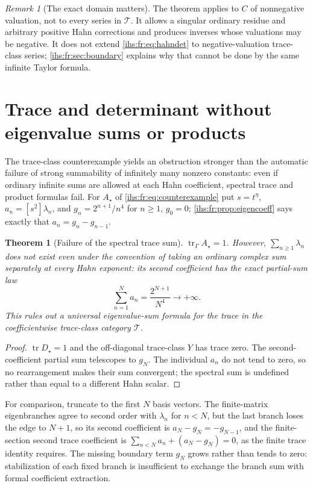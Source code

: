 \documentclass[11pt,a4paper]{article}
\numberwithin{equation}{section}
\newtheorem{theorem}{Theorem}[section]
\theoremstyle{definition}
\theoremstyle{remark}
\newtheorem{remark}[remark]{Remark}
\newcommand{\Tr}{\operatorname{tr}}
\newcommand{\TT}{\mathscr T}
\begin{document}
\begin{remark}[The exact domain matters]\label{ihs:fr:rem:domain}
The theorem applies to $C$ of nonnegative valuation, not to every series in
$\TT$. It allows a singular ordinary residue and arbitrary positive Hahn
corrections and produces inverses whose valuations may be negative. It does
not extend \eqref{ihs:fr:eq:hahndet} to negative-valuation trace-class
series; \cref{ihs:fr:sec:boundary} explains why that cannot be done by the
same infinite Taylor formula.
\end{remark}

\section{Trace and determinant without eigenvalue sums or products}\label{ihs:fr:sec:lidskii}

The trace-class counterexample yields an obstruction stronger than the
automatic failure of strong summability of infinitely many nonzero
constants: even if ordinary infinite sums are allowed at each Hahn
coefficient, spectral trace and product formulas fail. For $A_\star$ of
\eqref{ihs:fr:eq:counterexample} put $s=t^\eta$, $a_n=[s^2]\lambda_n$, and
$g_n=2^{n+1}/n^4$ for $n\ge1$, $g_0=0$; \cref{ihs:fr:prop:eigencoeff} says
exactly that $a_n=g_n-g_{n-1}$.

\begin{theorem}[Failure of the spectral trace sum]\label{ihs:fr:thm:nolidskii}
$\Tr_\Gamma A_\star=1$. However, $\sum_{n\ge1}\lambda_n$ does not exist even
under the convention of taking an ordinary complex sum separately at every
Hahn exponent: its second coefficient has the exact partial-sum law
\begin{equation}\label{ihs:fr:eq:traceboundary}
 \sum_{n=1}^Na_n=\frac{2^{N+1}}{N^4}\longrightarrow+\infty.
\end{equation}
This rules out a universal eigenvalue-sum formula for the trace in the
coefficientwise trace-class category $\TT$.
\end{theorem}
\begin{proof}
$\Tr D_\star=1$ and the off-diagonal trace-class $Y$ has trace zero. The
second-coefficient partial sum telescopes to $g_N$. The individual $a_n$ do
not tend to zero, so no rearrangement makes their sum convergent; the
spectral sum is undefined rather than equal to a different Hahn scalar.
\end{proof}

For comparison, truncate to the first $N$ basis vectors. The finite-matrix
eigenbranches agree to second order with $\lambda_n$ for $n<N$, but the last
branch loses the edge to $N+1$, so its second coefficient is
$a_N-g_N=-g_{N-1}$, and the finite-section second trace coefficient is
$\sum_{n<N}a_n+(a_N-g_N)=0$, as the finite trace identity requires. The
missing boundary term $g_N$ grows rather than tends to zero: stabilization of
each fixed branch is insufficient to exchange the branch sum with formal
coefficient extraction.
\end{document}
